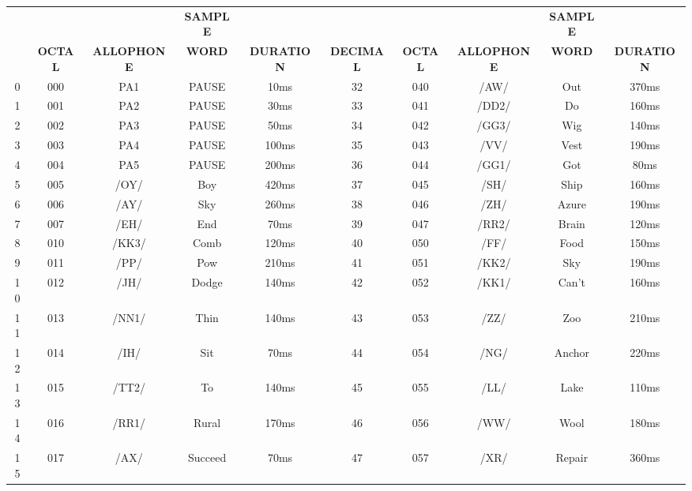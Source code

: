 \begin{table}[h!]

	\centering
	\sffamily  \footnotesize
	\renewcommand{\arraystretch}{1.25}
	\begin{adjustbox}{center}
	\begin{tabular}{|c|c|c|c|c|c|c|c|c|c|}
\hline
		\rowcolor{gray!20}
 &  &  & \tiny \textbf{SAMPLE} &  & &  & & \tiny \textbf{SAMPLE} & \\[-4pt]
		\rowcolor{gray!20}
 \multirow{-2}{*}{\tiny \textbf{DECIMAL}} &\multirow{-2}{*}{\tiny \textbf{OCTAL}} &  \multirow{-2}{*}{\tiny \textbf{ALLOPHONE}} & \tiny \textbf{WORD} & \multirow{-2}{*}{\tiny \textbf{DURATION}} & \multirow{-2}{*}{\tiny \textbf{DECIMAL}} &\multirow{-2}{*}{\tiny \textbf{OCTAL}} & \multirow{-2}{*}{\tiny \textbf{ALLOPHONE}} & \tiny \textbf{WORD} & \multirow{-2}{*}{\tiny \textbf{DURATION}}  \\
\hline
0 & 000 & PA1 & PAUSE & 10ms & 32 & 040 & /AW/ & Out & 370ms \\
1 & 001 & PA2 & PAUSE & 30ms & 33 & 041 & /DD2/ & Do & 160ms \\
2 & 002 & PA3 & PAUSE & 50ms & 34 & 042 & /GG3/ & Wig & 140ms \\
3 & 003 & PA4 & PAUSE & 100ms & 35 & 043 & /VV/ & Vest & 190ms \\
4 & 004 & PA5 & PAUSE & 200ms & 36 & 044 & /GG1/ & Got & 80ms \\
5 & 005 & /OY/ & Boy & 420ms & 37 & 045 & /SH/ & Ship & 160ms \\
6 & 006 & /AY/ & Sky & 260ms & 38 & 046 & /ZH/ & Azure & 190ms \\
7 & 007 & /EH/ & End & 70ms & 39 & 047 & /RR2/ & Brain & 120ms \\
8 & 010 & /KK3/ & Comb & 120ms & 40 & 050 & /FF/ & Food & 150ms \\
9 & 011 & /PP/ & Pow & 210ms & 41 & 051 & /KK2/ & Sky & 190ms \\
10 & 012 & /JH/ & Dodge & 140ms & 42 & 052 & /KK1/ & Can't & 160ms \\
11 & 013 & /NN1/ & Thin & 140ms & 43 & 053 & /ZZ/ & Zoo & 210ms \\
12 & 014 & /IH/ & Sit & 70ms & 44 & 054 & /NG/ & Anchor & 220ms \\
13 & 015 & /TT2/ & To & 140ms & 45 & 055 & /LL/ & Lake & 110ms \\
14 & 016 & /RR1/ & Rural & 170ms & 46 & 056 & /WW/ & Wool & 180ms \\
15 & 017 & /AX/ & Succeed & 70ms & 47 & 057 & /XR/ & Repair & 360ms \\

\end{tabular}
\end{adjustbox}
\end{table}
